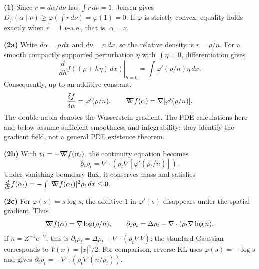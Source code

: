 \documentclass[11pt,a4paper]{article}
\theoremstyle{exostyle}
\newcommand{\gradW}{\mathord{\nabla\mkern-9.3mu\nabla}}
\begin{document}
\begin{solution}
\textbf{(1)} Since $r=d\alpha/d\nu$ has $\int r\,d\nu=1$, Jensen gives
$D_\varphi(\alpha\mid\nu)\ge\varphi(\int r\,d\nu)=\varphi(1)=0$.
If $\varphi$ is strictly convex, equality holds exactly when $r=1$ $\nu$-a.e., that is, $\alpha=\nu$.

\textbf{(2a)} Write $d\alpha=\rho\,dx$ and $d\nu=n\,dx$, so the relative density is $r=\rho/n$. For a smooth compactly supported perturbation $\eta$ with $\int\eta=0$, differentiation gives
\[
\left.\frac d{dh}f((\rho+h\eta)\,dx)\right|_{h=0}
=\int\varphi'(\rho/n)\eta\,dx.
\]
Consequently, up to an additive constant,
\[
\frac{\delta f}{\delta\alpha}=\varphi'(\rho/n),\qquad
\gradW f(\alpha)=\nabla[\varphi'(\rho/n)].
\]
The double nabla denotes the Wasserstein gradient. The PDE calculations here and below assume sufficient smoothness and integrability; they identify the gradient field, not a general PDE existence theorem.

\textbf{(2b)} With $v_t=-\gradW f(\alpha_t)$, the continuity equation becomes
\[
\partial_t\rho_t=\nabla\cdot\left(\rho_t\nabla[\varphi'(\rho_t/n)]\right).
\]
Under vanishing boundary flux, it conserves mass and satisfies
$\frac d{dt}f(\alpha_t)=-\int|\gradW f(\alpha_t)|^2\rho_t\,dx\le0$.

\textbf{(2c)} For $\varphi(s)=s\log s$, the additive $1$ in $\varphi'(s)$ disappears under the spatial gradient. Thus
\[
\gradW f(\alpha)=\nabla\log(\rho/n),\qquad
\partial_t\rho_t=\Delta\rho_t-\nabla\cdot(\rho_t\nabla\log n).
\]
If $n=Z^{-1}e^{-V}$, this is $\partial_t\rho_t=\Delta\rho_t+\nabla\cdot(\rho_t\nabla V)$; the standard Gaussian corresponds to $V(x)=|x|^2/2$. For comparison, reverse KL uses $\varphi(s)=-\log s$ and gives $\partial_t\rho_t=-\nabla\cdot(\rho_t\nabla(n/\rho_t))$.
\end{solution}
\end{document}

